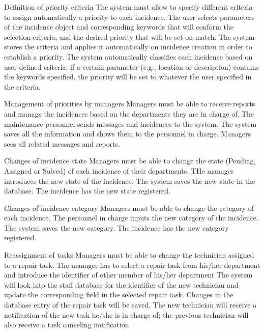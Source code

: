\begin{requirement}{Definition of priority criteria}
\reqdesc The system must allow to specify different criteria to assign automatically a priority to each incidence.
\reqin The user selects parameters of the incidence object and corresponding keywords that will conform the selection criteria, and the desired priority that will be set on match.
\reqsteps The system stores the criteria and applies it automatically on incidence creation in order to establish a priority.
\reqout The system automatically classifies each incidence based on user-defined criteria: if a certain parameter (e.g., location or description) contains the keywords specified, the priority will be set to whatever the user specified in the criteria.
\end{requirement}

\begin{requirement}{Management of priorities by managers}
\reqdesc Managers must be able to receive reports and manage the incidences based on the departments they are in charge of.
\reqin The maintenance personnel sends messages and incidences to the system.
\reqsteps The system saves all the information and shows them to the personnel in charge.
\reqout Managers sees all related messages and reports.
\end{requirement}

\begin{requirement}{Changes of incidence state}
\reqdesc Managers must be able to change the state (Pending, Assigned or Solved) of each incidence of their departments.
\reqin THe manager introduces the new state of the incidence.
\reqsteps The system saves the new state in the database.
\reqout The incidence has the new state registered.
\end{requirement}

\begin{requirement}{Changes of incidence category}
\reqdesc Managers must be able to change the category of each incidence.
\reqin The personnel in charge inputs the new category of the incidence.
\reqsteps The system saves the new category.
\reqout The incidence has the new category registered.
\end{requirement}

\begin{requirement}{Reassignment of tasks}
\reqdesc Managers must be able to change the technician assigned to a repair task.
\reqin The manager has to select a repair task from his/her department and introduce the identifier of other member of his/her department
\reqsteps The system will look into the staff database for the identifier of the new technician and update the corresponding field in the selected repair task.
\reqout Changes in the database entry of the repair task will be saved. The new technician will receive a notification of the new task he/she is in charge of; the previous technician will also receive a task canceling notification.
\end{requirement}

